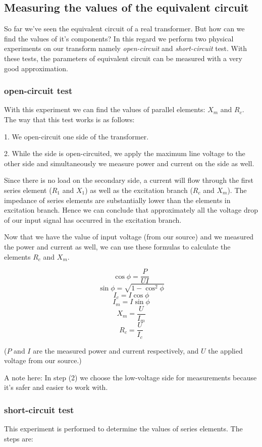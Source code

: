 \documentclass{article}
\begin{document}
	\subsection{Measuring the values of the equivalent circuit}
	So far we've seen the equivalent circuit of a real transformer. 
	But how can we find the values of it's components? In this regard we perform two physical experiments on our transform namely \textit{open-circuit} and \textit{short-circuit} test. 
	With these tests, the parameters of equivalent circuit can be measured with a very good approximation.
	
	\subsubsection{open-circuit test}
	With this experiment we can find the values of parallel elements: $X_m$ and $R_c$. The way that this test works is as follows:

	1. We open-circuit one side of the transformer.
	
	2. While the side is open-circuited, we apply the maximum line voltage to the other side and simultaneously we measure power and current on the side as well.

	Since there is no load on the secondary side, a current will flow through the first series element ($R_1$ and $X_1$) as well as the excitation branch ($R_c$ and $X_m$). 
	The impedance of series elements are substantially lower than the elements in excitation branch.
	Hence we can conclude that approximately all the voltage drop of our input signal has occurred in the excitation branch.
		
	Now that we have the value of input voltage (from our source) and we measured the power and current as well, we can use these formulas to calculate the elements $R_c$ and $X_m$.
	
	$$ \cos \phi = \frac{P}{U I} $$
	$$ \sin \phi = \sqrt{1 - \cos^2 \phi}$$
	$$I_c = I \cos \phi $$
	$$I_m = I \sin \phi $$
	$$X_m = \frac{U}{I_m} $$
	$$R_c = \frac{U}{I_c}$$
	
	($P$ and $I$ are the measured power and current respectively, and $U$ the applied voltage from our source.)
	
	A note here: In step (2) we choose the low-voltage side for measurements because it's safer and easier to work with.
	\subsubsection{short-circuit test}
	This experiment is performed to determine the values of series elements. 
	The steps are:
\end{document}

